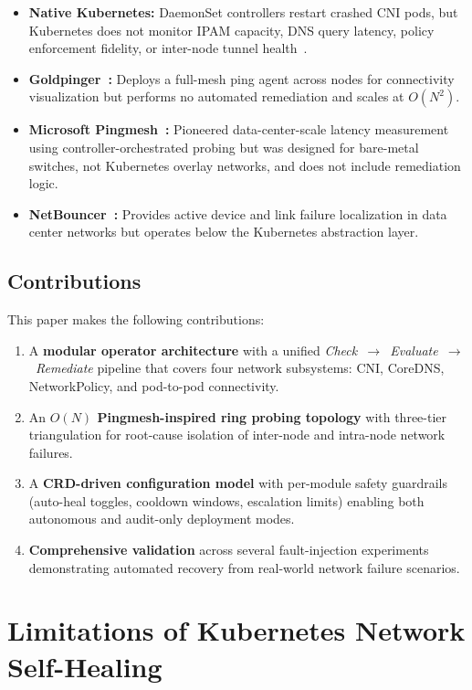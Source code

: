 \documentclass[conference]{IEEEtran}
\begin{document}
\begin{itemize}
  \item \textbf{Native Kubernetes:} DaemonSet controllers restart crashed CNI pods, but Kubernetes does not monitor IPAM capacity, DNS query latency, policy enforcement fidelity, or inter-node tunnel health~\cite{k8s-docs}.
  \item \textbf{Goldpinger~\cite{goldpinger}:} Deploys a full-mesh ping agent across nodes for connectivity visualization but performs no automated remediation and scales at $O(N^2)$.
  \item \textbf{Microsoft Pingmesh~\cite{pingmesh2015}:} Pioneered data-center-scale latency measurement using controller-orchestrated probing but was designed for bare-metal switches, not Kubernetes overlay networks, and does not include remediation logic.
  \item \textbf{NetBouncer~\cite{netbouncer2019}:} Provides active device and link failure localization in data center networks but operates below the Kubernetes abstraction layer.
\end{itemize}

\subsection{Contributions}

This paper makes the following contributions:
\begin{enumerate}
  \item A \textbf{modular operator architecture} with a unified \emph{Check~$\to$~Evaluate~$\to$~Remediate} pipeline that covers four network subsystems: CNI, CoreDNS, NetworkPolicy, and pod-to-pod connectivity.
  \item An \textbf{$O(N)$ Pingmesh-inspired ring probing topology} with three-tier triangulation for root-cause isolation of inter-node and intra-node network failures.
  \item A \textbf{CRD-driven configuration model} with per-module safety guardrails (auto-heal toggles, cooldown windows, escalation limits) enabling both autonomous and audit-only deployment modes.
  \item \textbf{Comprehensive validation} across several fault-injection experiments demonstrating automated recovery from real-world network failure scenarios.
\end{enumerate}

\section{Limitations of Kubernetes Network Self-Healing}
\end{document}
